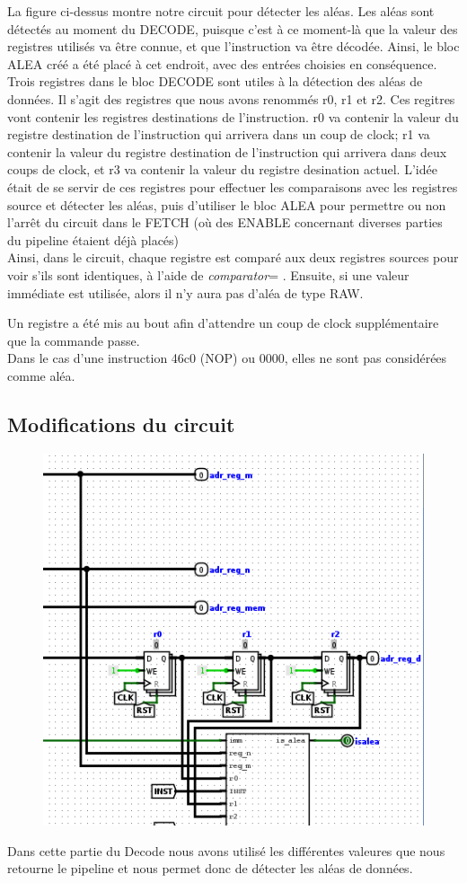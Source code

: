 \documentclass[a4paper]{article} %
\begin{document}
La figure ci-dessus montre notre circuit pour détecter les aléas. Les aléas sont détectés au moment du DECODE, puisque c'est à ce moment-là que la valeur des registres utilisés va être connue, et que l'instruction va être décodée. Ainsi, le bloc ALEA créé a été placé à cet endroit, avec des entrées choisies en conséquence.\\
Trois registres dans le bloc DECODE sont utiles à la détection des aléas de données. Il s'agit des registres que nous avons renommés r0, r1 et r2. Ces regitres vont contenir les registres destinations de l'instruction. r0 va contenir la valeur du registre destination de l'instruction qui arrivera dans un coup de clock; r1 va contenir la valeur du registre destination de l'instruction qui arrivera dans deux coups de clock, et r3 va contenir la valeur du registre desination actuel. L'idée était de se servir de ces registres pour effectuer les comparaisons avec les registres source et détecter les aléas, puis d'utiliser le bloc ALEA pour permettre ou non l'arrêt du circuit dans le FETCH (où des ENABLE concernant diverses parties du pipeline étaient déjà placés) \\

Ainsi, dans le circuit, chaque registre est comparé aux deux registres sources pour voir s'ils sont identiques, à l'aide de \textit{comparator}= . Ensuite, si une valeur immédiate est utilisée, alors il n'y aura pas d'aléa de type RAW.

Un registre a été mis au bout afin d'attendre un coup de clock supplémentaire que la commande passe.\\
Dans le cas d'une instruction 46c0 (NOP) ou 0000, elles ne sont pas considérées comme aléa.

\subsection{Modifications du circuit}
\begin{figure}[H]
   \centering
   \includegraphics[width=.8\textwidth]{src/Decode_ALEAS.png}
\end{figure}
Dans cette partie du Decode nous avons utilisé les différentes valeures que nous retourne le pipeline et nous permet donc de détecter les aléas de données.
\end{document}
